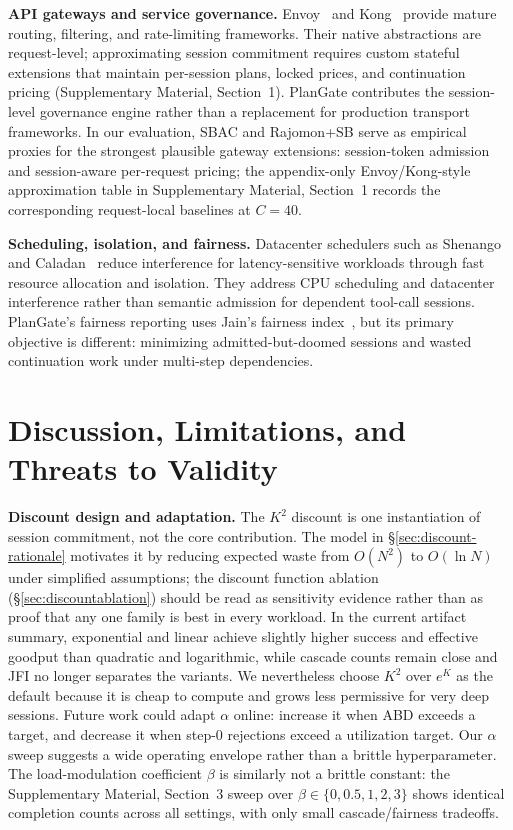 \documentclass[sigconf,review,anonymous]{acmart}
\begin{document}
\textbf{API gateways and service governance.} Envoy~\cite{envoy} and Kong~\cite{kong} provide mature routing, filtering, and rate-limiting frameworks. Their native abstractions are request-level; approximating session commitment requires custom stateful extensions that maintain per-session plans, locked prices, and continuation pricing (Supplementary Material, Section~1). PlanGate contributes the session-level governance engine rather than a replacement for production transport frameworks. In our evaluation, SBAC and Rajomon+SB serve as empirical proxies for the strongest plausible gateway extensions: session-token admission and session-aware per-request pricing; the appendix-only Envoy/Kong-style approximation table in Supplementary Material, Section~1 records the corresponding request-local baselines at $C{=}40$.

\textbf{Scheduling, isolation, and fairness.} Datacenter schedulers such as Shenango~\cite{shenango} and Caladan~\cite{caladan} reduce interference for latency-sensitive workloads through fast resource allocation and isolation. They address CPU scheduling and datacenter interference rather than semantic admission for dependent tool-call sessions. PlanGate's fairness reporting uses Jain's fairness index~\cite{jain_fairness}, but its primary objective is different: minimizing admitted-but-doomed sessions and wasted continuation work under multi-step dependencies.

\section{Discussion, Limitations, and Threats to Validity}

\textbf{Discount design and adaptation.}
The $K^2$ discount is one instantiation of session commitment, not the core contribution. The model in \S\ref{sec:discount-rationale} motivates it by reducing expected waste from $O(N^2)$ to $O(\ln N)$ under simplified assumptions; the discount function ablation (\S\ref{sec:discountablation}) should be read as sensitivity evidence rather than as proof that any one family is best in every workload. In the current artifact summary, exponential and linear achieve slightly higher success and effective goodput than quadratic and logarithmic, while cascade counts remain close and JFI no longer separates the variants. We nevertheless choose $K^2$ over $e^K$ as the default because it is cheap to compute and grows less permissive for very deep sessions. Future work could adapt $\alpha$ online: increase it when ABD exceeds a target, and decrease it when step-0 rejections exceed a utilization target. Our $\alpha$ sweep suggests a wide operating envelope rather than a brittle hyperparameter. The load-modulation coefficient $\beta$ is similarly not a brittle constant: the Supplementary Material, Section~3 sweep over $\beta\in\{0,0.5,1,2,3\}$ shows identical completion counts across all settings, with only small cascade/fairness tradeoffs.
\end{document}
